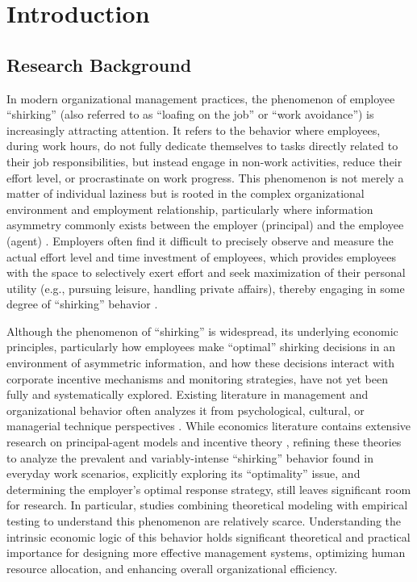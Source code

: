 \chapter{Introduction}

\section{Research Background}

In modern organizational management practices, the phenomenon of employee \enquote{shirking} (also referred to as \enquote{loafing on the job} or \enquote{work avoidance}) is increasingly attracting attention. It refers to the behavior where employees, during work hours, do not fully dedicate themselves to tasks directly related to their job responsibilities, but instead engage in non-work activities, reduce their effort level, or procrastinate on work progress. This phenomenon is not merely a matter of individual laziness but is rooted in the complex organizational environment and employment relationship, particularly where {information asymmetry} commonly exists between the employer (principal) and the employee (agent) \citep{akerlof1970market, spence1973job}. Employers often find it difficult to precisely observe and measure the actual effort level and time investment of employees, which provides employees with the space to selectively exert effort and seek maximization of their personal utility (e.g., pursuing leisure, handling private affairs), thereby engaging in some degree of \enquote{shirking} behavior \citep{alchian1972production}.

Although the phenomenon of \enquote{shirking} is widespread, its underlying economic principles, particularly how employees make \enquote{optimal} shirking decisions in an environment of asymmetric information, and how these decisions interact with corporate incentive mechanisms and monitoring strategies, have not yet been fully and systematically explored. Existing literature in management and organizational behavior often analyzes it from psychological, cultural, or managerial technique perspectives \citep[e.g.,][]{ashforth1990social, robbins2016organizational}. While economics literature contains extensive research on principal-agent models and incentive theory \citep{holmstrom1979moral, grossman1983analysis}, refining these theories to analyze the prevalent and variably-intense \enquote{shirking} behavior found in everyday work scenarios, explicitly exploring its \enquote{optimality} issue, and determining the employer's optimal response strategy, still leaves significant room for research. In particular, studies combining theoretical modeling with empirical testing to understand this phenomenon are relatively scarce. Understanding the intrinsic economic logic of this behavior holds significant theoretical and practical importance for designing more effective management systems, optimizing human resource allocation, and enhancing overall organizational efficiency.

